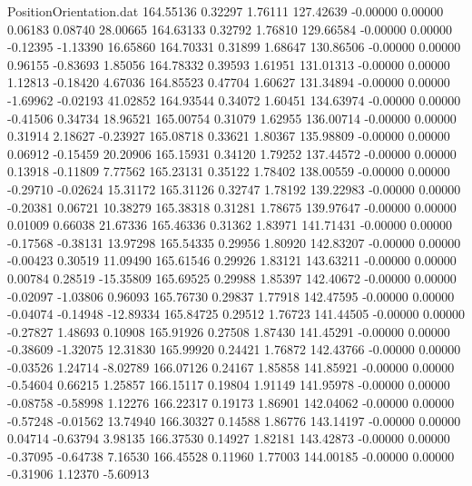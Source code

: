 \begin{filecontents}{PositionOrientation.dat}
 164.55136    0.32297    1.76111   127.42639   -0.00000    0.00000    0.06183    0.08740   28.00665
 164.63133    0.32792    1.76810   129.66584   -0.00000    0.00000   -0.12395   -1.13390   16.65860
 164.70331    0.31899    1.68647   130.86506   -0.00000    0.00000    0.96155   -0.83693    1.85056
 164.78332    0.39593    1.61951   131.01313   -0.00000    0.00000    1.12813   -0.18420    4.67036
 164.85523    0.47704    1.60627   131.34894   -0.00000    0.00000   -1.69962   -0.02193   41.02852
 164.93544    0.34072    1.60451   134.63974   -0.00000    0.00000   -0.41506    0.34734   18.96521
 165.00754    0.31079    1.62955   136.00714   -0.00000    0.00000    0.31914    2.18627   -0.23927
 165.08718    0.33621    1.80367   135.98809   -0.00000    0.00000    0.06912   -0.15459   20.20906
 165.15931    0.34120    1.79252   137.44572   -0.00000    0.00000    0.13918   -0.11809    7.77562
 165.23131    0.35122    1.78402   138.00559   -0.00000    0.00000   -0.29710   -0.02624   15.31172
 165.31126    0.32747    1.78192   139.22983   -0.00000    0.00000   -0.20381    0.06721   10.38279
 165.38318    0.31281    1.78675   139.97647   -0.00000    0.00000    0.01009    0.66038   21.67336
 165.46336    0.31362    1.83971   141.71431   -0.00000    0.00000   -0.17568   -0.38131   13.97298
 165.54335    0.29956    1.80920   142.83207   -0.00000    0.00000   -0.00423    0.30519   11.09490
 165.61546    0.29926    1.83121   143.63211   -0.00000    0.00000    0.00784    0.28519  -15.35809
 165.69525    0.29988    1.85397   142.40672   -0.00000    0.00000   -0.02097   -1.03806    0.96093
 165.76730    0.29837    1.77918   142.47595   -0.00000    0.00000   -0.04074   -0.14948  -12.89334
 165.84725    0.29512    1.76723   141.44505   -0.00000    0.00000   -0.27827    1.48693    0.10908
 165.91926    0.27508    1.87430   141.45291   -0.00000    0.00000   -0.38609   -1.32075   12.31830
 165.99920    0.24421    1.76872   142.43766   -0.00000    0.00000   -0.03526    1.24714   -8.02789
 166.07126    0.24167    1.85858   141.85921   -0.00000    0.00000   -0.54604    0.66215    1.25857
 166.15117    0.19804    1.91149   141.95978   -0.00000    0.00000   -0.08758   -0.58998    1.12276
 166.22317    0.19173    1.86901   142.04062   -0.00000    0.00000   -0.57248   -0.01562   13.74940
 166.30327    0.14588    1.86776   143.14197   -0.00000    0.00000    0.04714   -0.63794    3.98135
 166.37530    0.14927    1.82181   143.42873   -0.00000    0.00000   -0.37095   -0.64738    7.16530
 166.45528    0.11960    1.77003   144.00185   -0.00000    0.00000   -0.31906    1.12370   -5.60913

\end{filecontents}
